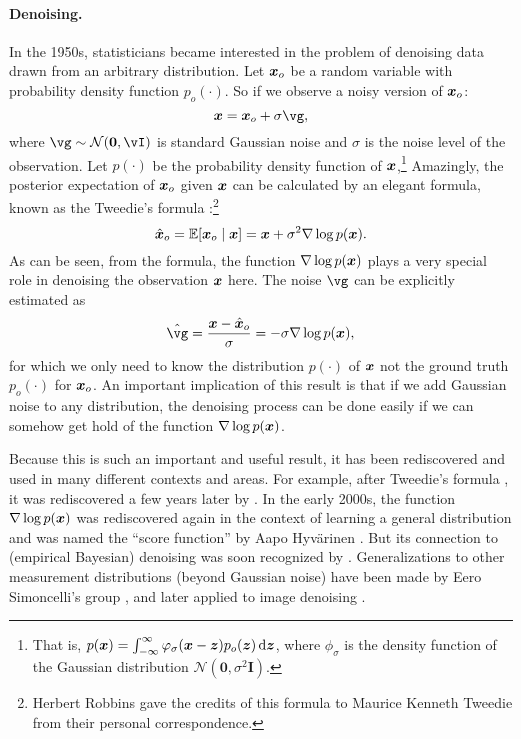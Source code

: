 \documentclass[\toplevelprefix/book-main.tex]{subfiles}
\begin{document}
\paragraph{Denoising.} In the 1950s, statisticians became interested in the problem of denoising data drawn from an arbitrary distribution. Let $\bm{x}_o$ be a random variable with probability density function $p_o(\cdot)$. So if we observe a noisy version of $\bm{x}_o$:
\begin{equation}
    \x = \x_o + \sigma \vg, 
\end{equation}
where $\vg \sim \dNorm(\vzero, \vI)$ is standard Gaussian noise and $\sigma$ is the noise level of the observation. Let $p(\cdot)$ be the probability density function of $\bm{x}$,\footnote{That is, $p(\x) = \int_{-\infty}^{\infty} \phi_{\sigma}(\x - \z)p_o(\z) \odif{\z}$, where $\phi_{\sigma}$ is the density function of the Gaussian distribution $\mathcal{N}(\boldsymbol{0}, \sigma^2 \boldsymbol{I})$.} Amazingly, the posterior expectation of $\bm{x}_o$ given $\bm{x}$ can be calculated by an elegant formula, known as the Tweedie's formula \cite{Robbins1956AnEB}:\footnote{Herbert Robbins gave the credits of this formula to Maurice Kenneth Tweedie from their personal correspondence.}
\begin{equation}
    \hat {\bm{x}}_o = \mathbb{E}[\bm{x}_o\mid \bm{x}] = \bm{x} + \sigma^2 \nabla \log p(\bm{x}).
\end{equation}
As can be seen, from the formula, the function $\nabla \log p(\bm{x})$ plays a very special role in denoising the observation $\bm{x}$ here. The noise $\vg$ can be explicitly estimated as
\begin{equation}
    \hat{\vg} = \frac{\x - \hat \x_o}{\sigma} = -\sigma \nabla \log p(\x),
\end{equation}
for which we only need to know the distribution $p(\cdot)$ of $\bm{x}$ not the ground truth $p_o(\cdot)$ for $\bm{x}_o$. An important implication of this result is that if we add Gaussian noise to any distribution, the denoising process can be done easily if we can somehow get hold of the function $\nabla \log p(\bm{x})$.

Because this is such an important and useful result, it has been rediscovered and used in many different contexts and areas. For example, after Tweedie's formula \cite{Robbins1956AnEB}, it was rediscovered a few years later by \cite{Miyasawa61}. In the early 2000s, the function $\nabla \log p(\bm{x})$ was rediscovered again in the context of learning a general distribution and was named the ``score function'' by Aapo Hyv\"{a}rinen \cite{hyvarinen05a}. But its connection to (empirical Bayesian) denoising was soon recognized by \cite{Vincent2011}.
Generalizations to other measurement distributions (beyond Gaussian noise) have been made by Eero Simoncelli's group \cite{Raphan10}, and later applied to image denoising \cite{Kadkhodaie21a,ho2020denoising}.
\end{document}
